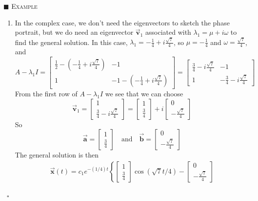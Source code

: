 \documentclass[reqno]{immbook}
\newcommand{\BA}{\vec{\textbf{a}}}
\newcommand{\BB}{\vec{\textbf{b}}}
\newcommand{\BV}{\vec{\textbf{v}}}
\newcommand{\BX}{\vec{\textbf{x}}}
\numberwithin{equation}{chapter}
\numberwithin{question}{section}
\numberwithin{theorem}{chapter}
\numberwithin{figure}{chapter}
\theoremstyle{definition}
\newenvironment{xexample}%
{%

\medskip\noindent\addtocounter{example}{1}$\blacksquare$ \textsc{Example \theexample}\hspace*{1em}%
}%
{%
~\hfill$\square$

\medskip
}
\begin{document}
\begin{xexample}
\begin{enumerate}
\item In the complex case, we don't need the eigenvectors
to sketch the phase portrait, but we do need an eigenvector
$\BV_1$ associated with $\lambda_1 = \mu + i \omega$
to find the general solution.
In this case, $\lambda_1 = -\frac{1}{4}+i\frac{\sqrt{7}}{4}$,
so $\mu = -\frac{1}{4}$ and $\omega = \frac{\sqrt{7}}{4}$,
and
\begin{equation}
A-\lambda_1 I =
  \begin{bmatrix}
     \frac{1}{2} - \left( -\frac{1}{4}+i\frac{\sqrt{7}}{4} \right) & -1 \\
     1 & -1 -\left( -\frac{1}{4}+i\frac{\sqrt{7}}{4} \right)
  \end{bmatrix}
     = 
  \begin{bmatrix}
          \frac{3}{4}-i\frac{\sqrt{7}}{4} & -1 \\
	  1 & -\frac{3}{4}-i\frac{\sqrt{7}}{4}
  \end{bmatrix}
\end{equation}
From the first row of $A-\lambda_1 I$ we see that we can choose
\begin{equation}
  \BV_1 = \begin{bmatrix} 1 \\ \frac{3}{4}-i\frac{\sqrt{7}}{4} \end{bmatrix}
   = \begin{bmatrix} 1 \\ \frac{3}{4} \end{bmatrix}
      + i \begin{bmatrix} 0 \\ -\frac{\sqrt{7}}{4} \end{bmatrix}
\end{equation}
So
\begin{equation}
  \BA = \begin{bmatrix} 1 \\ \frac{3}{4} \end{bmatrix}
  \quad \textrm{and} \quad
  \BB = \begin{bmatrix} 0 \\ -\frac{\sqrt{7}}{4} \end{bmatrix}
\end{equation}
The general solution is then
\begin{multline}
  \BX(t) = c_1 e^{-(1/4)t}
      \left\{\begin{bmatrix} 1 \\ \frac{3}{4} \end{bmatrix} \cos\left( \sqrt{7}t/4\right)
      - \begin{bmatrix} 0 \\ -\frac{\sqrt{7}}{4} \end{bmatrix}

\end{multline}
\end{enumerate}
\end{xexample}
\end{document}
